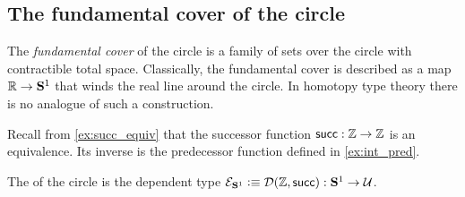 \begin{comment}
\begin{defn}\label{defn:fiber_sequence}
A \define{fiber sequence} 
\begin{equation*}
F \hookrightarrow E \twoheadrightarrow B
\end{equation*}
consists of a \define{base type} $B$ with a base point $b_0$ and a dependent type $P:B\to\type$, a type $F$ called the \define{fiber} with an equivalence $\eqv{P(b_0)}{F}$, and a type $E$ called the \define{total space} with a map $p:E\to B$ and an equivalence $e:\eqv{(\sm{b:B}P(b))}{E}$ such that the triangle
\begin{equation*}
\begin{tikzcd}
\Big(\sm{b:B}P(b)\Big) \arrow[rr,"e"] \arrow[dr,swap,"\proj 1"] & & E \arrow[dl,"p"] \\
& B
\end{tikzcd}
\end{equation*}
commutes.
\end{defn}
\end{comment}

\subsection{The fundamental cover of the circle}

The \emph{fundamental cover} of the circle is a family of sets over the circle with contractible total space.
Classically, the fundamental cover is described as a map $\mathbb{R}\to\mathbf{S}^{1}$ that winds the real line around the circle.
In homotopy type theory there is no analogue of such a construction.

Recall from \cref{ex:succ_equiv} that the successor function $\mathsf{succ}:{\mathbb{Z}}\to {\mathbb{Z}}$ is an equivalence. Its inverse is the predecessor function defined in \cref{ex:int_pred}. 

\begin{defn}
The  of the circle is the dependent type $\mathcal{E}_{\mathbf{S}^{1}}\vcentcolon\equiv\mathcal{D}({\mathbb{Z}},\mathsf{succ}):\mathbf{S}^{1}\to\mathcal{U}$.
\end{defn}

